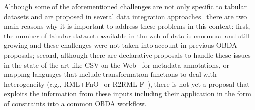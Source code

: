 Although some of the aforementioned challenges are not only specific to tabular datasets and are proposed in several data integration approaches~\citep{golshan2017data,halevy2006data,doan2012principles} there are two main reasons why it is important to address these problems in this context: first, the number of tabular datasets available in the web of data is enormous and still growing and these challenges were not taken into account in previous OBDA proposals; second, although there are declarative proposals to handle these issues in the state of the art like CSV on the Web~\citep{tennison2015model} for metadata annotations, or mapping languages that include transformation functions to deal with heterogeneity (e.g., RML+FnO~\citep{de2017declarative} or R2RML-F~\citep{debruyne2016r2rml}), there is not yet a proposal that exploits the information from these inputs including their application in the form of constraints into a common OBDA workflow.



